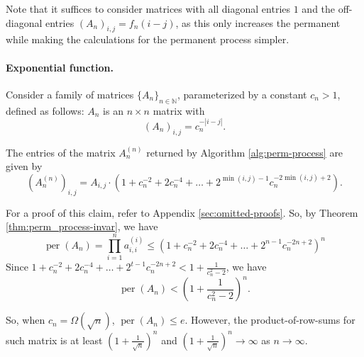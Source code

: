 \documentclass[11pt]{article}
\theoremstyle{definition}
\DeclareMathOperator{\per}{per}
\begin{document}
Note that it suffices to consider matrices with all diagonal entries $1$ and the off-diagonal entries $(A_n)_{i,j} = f_n(i-j)$, as this only increases the permanent while making the calculations for the permanent process simpler. 

\paragraph{Exponential function.}


Consider a family of matrices $\{ A_n\}_{n \in \mathbb{N}}$, parameterized by a constant $c_n > 1$, defined as follows: $A_n$ is an $n \times n$ matrix with 
\begin{equation*}
    (A_n)_{i,j} = c_n^{-|i-j|}.
\end{equation*}

\begin{claim} \label{claim:exp-matrix}
    The entries of the matrix $A_n^{(n)}$ returned by Algorithm \ref{alg:perm-process} are given by 
\begin{equation*}
    (A^{(n)}_n)_{i,j} = A_{i,j} \cdot \left(1 + c_n^{-2} + 2 c_n^{-4} + \ldots + 2^{\min(i,j)-1} c_n^{-2\min(i,j)+2}\right).
\end{equation*}
\end{claim}
 For a proof of this claim, refer to Appendix \ref{sec:omitted-proofs}.
So, by Theorem \ref{thm:perm_process-invar}, we have
\begin{equation*}
    \per(A_n) = \prod_{i=1}^n a^{(i)}_{i,i} \leq \left(1 + c_n^{-2} + 2 c_n^{-4} + \ldots + 2^{n-1} c_n^{-2n+2}\right)^n
\end{equation*}
Since $1 + c_n^{-2} + 2 c_n^{-4} + \ldots + 2^{t-1} c_n^{-2n+2} < 1 + \frac{1}{c_n^2-2} $, we have 
\begin{equation*}
    \per(A_n) < \left(1+\frac{1}{c_n^2-2}\right)^n.
\end{equation*}

So, when $c_n = \Omega(\sqrt{n})$, $\per(A_n) \leq e$. However, the product-of-row-sums for such matrix is at least $(1 + \frac{1}{\sqrt{n}})^n$ and $(1 + \frac{1}{\sqrt{n}})^n \to \infty$ as $n\to \infty$. 
\end{document}
